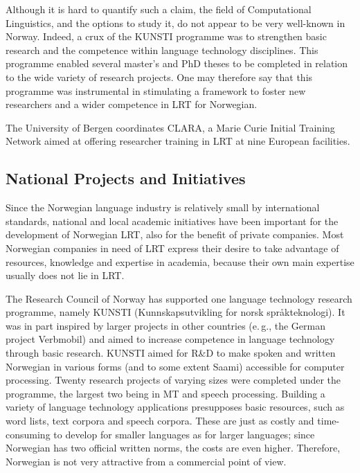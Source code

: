 \begin{multicols}{2}
Although it is hard to quantify such a claim, the field of Computational Linguistics, and the options to study it, do not appear to be very well-known in Norway. 
Indeed, a crux of the KUNSTI programme was to strengthen basic research and the competence within language technology disciplines. %
This programme enabled several master's and PhD theses to be completed in relation to the wide variety of research projects. 
One may therefore say that this programme was instrumental in stimulating a framework to foster new researchers and a wider competence in LRT for Norwegian.

The University of Bergen coordinates CLARA, a Marie Curie Initial Training Network aimed at offering researcher training in LRT at nine European facilities.

\subsection{National Projects and Initiatives}

Since the Norwegian language industry is relatively small by international standards, national and local academic initiatives have been important for the development of Norwegian LRT, also for the benefit of private companies.
Most Norwegian companies in need of LRT express their desire to take advantage of resources, knowledge and expertise in academia, because their own main expertise usually does not lie in LRT.

The Research Council of Norway has supported one language technology research programme, namely KUNSTI (Kunnskapsutvikling for norsk språkteknologi).
It was in part inspired by larger projects in other countries (e.\,g.,
the German project Verbmobil) and aimed to increase competence in language technology through basic research. 
KUNSTI aimed for R\&D to make spoken and written Norwegian in various forms (and to some extent Saami) accessible for computer processing. 
Twenty research projects of varying sizes were completed under the programme, the largest two being in MT and speech processing. Building a variety of language technology applications presupposes basic resources, such as word lists, text corpora and speech corpora. 
These are just as costly and time-consuming to develop for smaller languages as for larger languages; since Norwegian has two official written norms, the costs are even higher. 
Therefore, Norwegian is not very attractive from a commercial point of view. 


\end{multicols}
